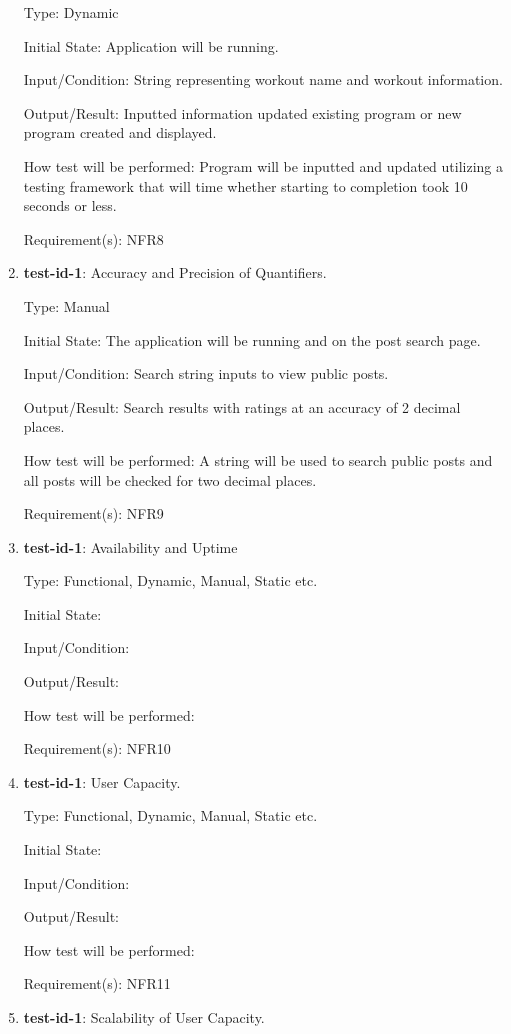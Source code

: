 \documentclass[12pt, titlepage]{article}
\begin{document}
\begin{enumerate}
		Type: Dynamic
		
		Initial State: Application will be running.
		
		Input/Condition: String representing workout name and workout information.
		
		Output/Result: Inputted information updated existing program or new program created and displayed.
		
		How test will be performed: Program will be inputted and updated utilizing a testing framework that will time whether starting to completion took 10 seconds or less. 
		
		Requirement(s): NFR8
		
		\item{\textbf{test-id-1}}: Accuracy and Precision of Quantifiers.
		
		Type: Manual
		
		Initial State: The application will be running and on the post search page.
		
		Input/Condition: Search string inputs to view public posts.
		
		Output/Result: Search results with ratings at an accuracy of 2 decimal places.
		
		How test will be performed: A string will be used to search public posts and all posts will be checked for two decimal places.
		
		Requirement(s): NFR9
		
		\item{\textbf{test-id-1}}: Availability and Uptime
		
		Type: Functional, Dynamic, Manual, Static etc.
		
		Initial State: 
		
		Input/Condition: 
		
		Output/Result: 
		
		How test will be performed: 
		
		Requirement(s): NFR10
		
		\item{\textbf{test-id-1}}: User Capacity.
		
		Type: Functional, Dynamic, Manual, Static etc.
		
		Initial State: 
		
		Input/Condition: 
		
		Output/Result: 
		
		How test will be performed: 
		
		Requirement(s): NFR11
		
		\item{\textbf{test-id-1}}: Scalability of User Capacity.
		

\end{enumerate}
\end{document}
